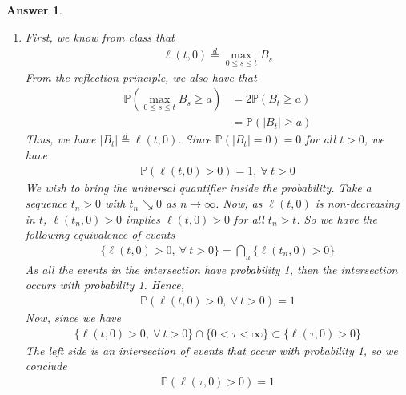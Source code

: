 \documentclass[12pt]{article}
\theoremstyle{colon}
\newtheorem*{answer}{Answer}
\begin{document}
\begin{answer}
  \begin{enumerate}[label=\alph*)]
    \item First, we know from class that
      \begin{gather*}
        \ell(t,0) \stackrel{d}{=} \max_{0 \leq s \leq t} B_s
      \end{gather*}
      From the reflection principle, we also have that
      \begin{align*}
        \mathbb{P}(\max_{0 \leq s \leq t} B_s \geq a) &= 2 \mathbb{P}(B_t \geq a) \\
        &= \mathbb{P}(\lvert B_t \rvert \geq a)
      \end{align*}
      Thus, we have $\lvert B_t \rvert \stackrel{d}{=} \ell(t,0)$. Since $\mathbb{P}(\lvert B_t \rvert = 0) = 0$ for all $t > 0$, we have
      \begin{gather*}
        \mathbb{P}(\ell(t,0) > 0) = 1, \ \forall \ t > 0
      \end{gather*}
      We wish to bring the universal quantifier inside the probability. Take a sequence $t_n > 0$ with $t_n \searrow 0$ as $n \rightarrow \infty$. Now, as $\ell(t,0)$ is non-decreasing in $t$, $\ell(t_n, 0) > 0$ implies $\ell(t,0) > 0$ for all  $t_n > t$. So we have the following equivalence of events
      \begin{gather*}
        \{ \ell(t,0) > 0, \ \forall \ t > 0 \} = \bigcap_n \{ \ell(t_n,0) > 0 \}
      \end{gather*}
      As all the events in the intersection have probability 1, then the intersection occurs with probability 1. Hence,
      \begin{gather*}
        \mathbb{P}(\ell(t,0) > 0, \ \forall \ t > 0) = 1
      \end{gather*}
      Now, since we have
      \begin{gather*}
        \{ \ell(t,0) > 0, \ \forall \ t > 0 \} \cap \{0 < \tau < \infty\} \subset \{ \ell(\tau,0) > 0 \}
      \end{gather*}
      The left side is an intersection of events that occur with probability 1, so we conclude
      \begin{gather*}
        \mathbb{P}(\ell(\tau,0) > 0) = 1
      \end{gather*}


\end{enumerate}
\end{answer}
\end{document}
